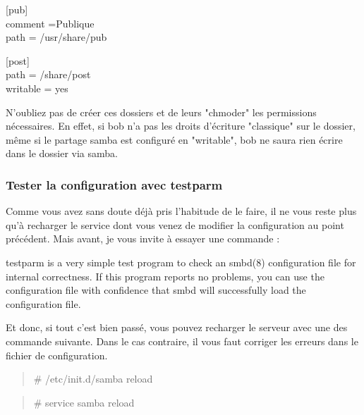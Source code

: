 \documentclass[a4paper,11pt]{article}
\newcommand{\commande}[1] {
    \begin{quote}
    \tt\raggedright #1 
    \end{quote}
}
\newcommand{\man}[2]{
    \begin{tcolorbox}[toprule=3mm,width=\textwidth,outer arc=0mm,colbacktitle=grayman,coltitle=black,colback={grayman},colframe={grayman},title={man : \tt #1}]
        \tt\raggedright #2
    \end{tcolorbox}
}
\newcommand{\demi}[1]{
\begin{minipage}[t]{0.45\textwidth}
    \tt\raggedright
    #1
\end{minipage}
}
\begin{document}
\demi{
[pub]\\
comment =Publique\\
path = /usr/share/pub
}
\demi{
[post]\\
path = /share/post\\
writable = yes
}
\par N'oubliez pas de créer ces dossiers et de leurs "chmoder" les permissions nécessaires. En effet, si bob n'a pas les droits d'écriture "classique" sur le dossier, même si le partage samba est configuré en "writable", bob ne saura rien écrire dans le dossier via samba.

\subsubsection{Tester la configuration avec testparm}
\par Comme vous avez sans doute déjà pris l'habitude de le faire, il ne vous reste plus qu'à recharger le service dont vous venez de modifier la configuration au point précédent. Mais avant, je vous invite à essayer une commande :
\man{testparm}{testparm is a very simple test program to check an smbd(8) configuration file for internal correctness. If this program reports no problems, you can use the configuration file with confidence that smbd will successfully load the configuration file.}
\par Et donc, si tout c'est bien passé, vous pouvez recharger le serveur avec une des commande suivante. Dans le cas contraire, il vous faut corriger les erreurs dans le fichier de configuration.
\commande{\# /etc/init.d/samba reload}
\commande{\# service samba reload}
\end{document}
